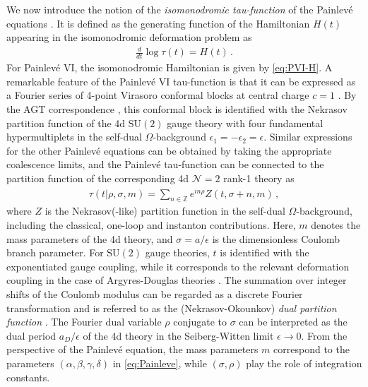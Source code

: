 \documentclass[11pt, a4paper]{article}
\theoremstyle{definition}
\begin{document}
We now introduce the notion of the \emph{isomonodromic tau-function} of the Painlev\'e equations \cite{Jimbo:1981tov}. It is defined as the generating function of the Hamiltonian $ H(t) $ appearing in the isomonodromic deformation problem as
\begin{align}
    \frac{d}{dt} \log \tau(t) = H(t) \, .
\end{align}
For Painlev\'e VI, the isomonodromic Hamiltonian is given by \eqref{eq:PVI-H}. A remarkable feature of the Painlev\'e VI tau-function is that it can be expressed as a Fourier series of 4-point Virasoro conformal blocks at central charge $ c=1 $ \cite{Gamayun:2012ma, Iorgov:2014vla, Bershtein:2014yia}. By the AGT correspondence \cite{Alday:2009aq}, this conformal block is identified with the Nekrasov partition function of the 4d $ \mathrm{SU}(2) $ gauge theory with four fundamental hypermultiplets in the self-dual $ \Omega $-background $ \epsilon_1=-\epsilon_2=\epsilon $. Similar expressions for the other Painlev\'e equations can be obtained by taking the appropriate coalescence limits, and the Painlev\'e tau-function can be connected to the partition function of the corresponding 4d $ \mathcal{N}=2 $ rank-1 theory as \cite{Gamayun:2013auu, Bonelli:2016qwg}
\begin{align}\label{eq:dualpf}
    \tau(t | \rho, \sigma, m) = \sum_{n\in \mathbb{Z}} e^{in\rho} Z(t, \sigma+n, m) \, ,
\end{align}
where $ Z $ is the Nekrasov(-like) partition function in the self-dual $ \Omega $-background, including the classical, one-loop and instanton contributions. Here, $ m $ denotes the mass parameters of the 4d theory, and $ \sigma=a/\epsilon $ is the dimensionless Coulomb branch parameter. For $ \mathrm{SU}(2) $ gauge theories, $ t $ is identified with the exponentiated gauge coupling, while it corresponds to the relevant deformation coupling in the case of Argyres-Douglas theories \cite{Bonelli:2016qwg}. The summation over integer shifts of the Coulomb modulus can be regarded as a discrete Fourier transformation and is referred to as the (Nekrasov-Okounkov) \emph{dual partition function} \cite{Nekrasov:2003rj}. The Fourier dual variable $ \rho $ conjugate to $ \sigma $ can be interpreted as the dual period $ a_D/\epsilon $ of the 4d theory in the Seiberg-Witten limit $ \epsilon\to 0 $. From the perspective of the Painlev\'e equation, the mass parameters $ m $ correspond to the parameters $ (\alpha,\beta,\gamma,\delta) $ in \eqref{eq:Painleve}, while $ (\sigma, \rho) $ play the role of integration constants.
\end{document}

